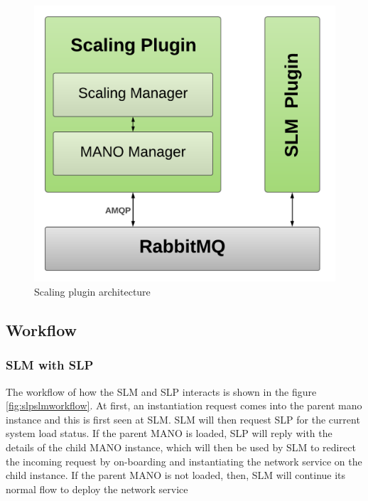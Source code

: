 \begin{figure}[h]
	\centering
	\includegraphics[width=0.7\linewidth]{figures/scalingarch}
	\caption{Scaling plugin architecture}
	\label{fig:scalingarch}
\end{figure}


\subsection{Workflow}

\subsubsection{SLM with SLP}

The workflow of how the SLM and SLP interacts is shown in the figure \ref{fig:slpslmworkflow}. At first, an instantiation request comes into the parent mano instance and this is first seen at SLM. SLM will then request SLP for the current system load status. If the parent MANO is loaded, SLP will reply with the details of the child MANO instance, which will then be used by SLM to redirect the incoming request by on-boarding and instantiating the network service on the child instance. If the parent MANO is not loaded, then, SLM will continue its normal flow to deploy the network service

